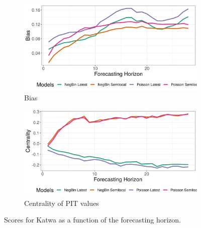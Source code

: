 \begin{figure}[H]
\begin{subfigure}{0.5\textwidth}
  \centering
  \includegraphics[width=\linewidth]{../output/Katwa_bias.png}  
  \caption{Bias}
  \label{fig:Katwa_scores_3}
\end{subfigure}
\begin{subfigure}{0.5\textwidth}
  \centering
  \includegraphics[width=\linewidth]{../output/Katwa_centrality.png}  
  \caption{Centrality of PIT values}
  \label{fig:Katwa_scores_4}
\end{subfigure}
  \caption{Scores for Katwa as a function of the forecasting horizon.}

  \label{fig:nat_scores}
\end{figure}

